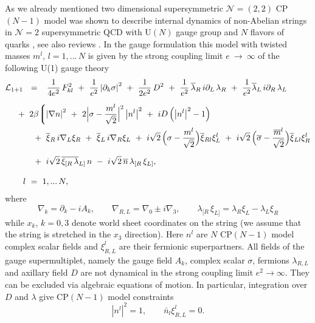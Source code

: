 \documentclass[12pt]{article}
\def\beq{\begin{equation}}
\def\eeq{\end{equation}}
\newcommand{\ntwo}{${\mathcal N}=2$ }
\newcommand{\ntwot}{${\mathcal N}= \left(2,2\right) $ }
\newcommand{\p}{\partial}
\newcommand{\ov}{\overline}
\newcommand{\mc}[1]{\mathcal{#1}}
\newcommand{\bxir}{\ov{\xi}{}_R}
\newcommand{\bxil}{\ov{\xi}{}_L}
\newcommand{\xir}{\xi_R}
\newcommand{\xil}{\xi_L}
\newcommand{\nbar}{\ov{n}}
\newcommand{\lar}{\lambda_R}
\newcommand{\lal}{\lambda_L}
\newcommand{\blar}{\ov{\lambda}{}_R}
\newcommand{\blal}{\ov{\lambda}{}_L}
\begin{document}
As we already mentioned two dimensional
supersymmetric \ntwot CP$(N-1)$  model was shown to describe
internal dynamics of  non-Abelian strings in \ntwo
supersymmetric QCD with U$(N)$ gauge group and $N$ flavors
of quarks \cite{HT1,ABEKY,SYmon,HT2}, see
also reviews \cite{Trev,SYrev,Jrev,Trev2}. In the gauge formulation this model 
with twisted
masses $ m^l $, $ l = 1, ...\, N $ is given by the strong coupling limit $ e ~\to~ \infty $ of
the following U(1) gauge theory \cite{W79}
\begin{align}
\label{sigma22}
% 
\notag
 	\mc{L}_\text{1+1} & ~~=~~
	\,\frac{1}{4e^2}\,F_{kl}^2  ~+~ \frac{1}{e^2} \left|\p_k \sigma\right|^2 
	~+~ \frac{1}{2e^2}\, D^2
	~+~ \frac{1}{e^2}\, \blar\, i\p_L\, \lar  ~+~  \frac{1}{e^2} \blal\, i\p_R\, \lal
	\\[2mm]
%
\notag
	&
	\hspace{-0.4cm}
	~+~ 2\beta \biggl \lgroup
	\left| \nabla n \right|^2  ~+~ 2 \Bigl| \sigma - \frac{m^l}
	{\sqrt{2}} \Bigr|^2 \left| n^l \right|^2
	~+~ iD \left( \left|n^l \right|^2 - 1 \right)
	\\
%
\notag
	&
	\hspace{-0.4cm}\phantom{2\beta\lgroup}
	~+~ \bxir\, i\nabla_L \xir  ~+~ \bxil\, i\nabla_R \xil ~+~
	i\sqrt{2}\, \Bigl( \sigma - \frac{m^l}{\sqrt{2}} \Bigr) \ov{\xi}{}_{Rl} \xi_L^l
	~+~ i\sqrt{2}\, \Bigl( \ov{\sigma} - \frac{\ov{m}{}^l}{\sqrt{2}} \Bigr) \ov{\xi}{}_{Ll} \xi_R^l
	\\[2mm]
%
	&
	\hspace{-0.4cm}\phantom{2\beta\lgroup}
	~+~ i\sqrt{2}\, \ov{\xi_{[R}\, \lambda}{}_{L]}\, n
	~-~ i\sqrt{2}\, \nbar\,  \lambda_{[R}\, \xi_{L]}
 ,
	\\[1mm]
%
\notag
	&
	l~=~1,...\,N,
\end{align}
where
\beq
\nabla_k=\p_k-iA_k, \qquad \nabla_{R,L}=\nabla_0\pm i\nabla_3,
\qquad \lambda_{[R}\, \xi_{L]}= \lambda_R\xi_L-\lambda_L\xi_R
\eeq
while $x_k$, $k=0,3$ denote world sheet coordinates
on the string (we assume that the string is stretched in the
$x_3$ direction). Here $n^l$ are $N$ CP$(N-1)$ model 
complex scalar fields
and $\xi^l_{R,L}$ are their fermionic superpartners.
All fields of the gauge supermultiplet, namely
the gauge field $A_k$, complex scalar $\sigma$, fermions
$\lambda_{R,L}$ and axillary field $D$ are not dynamical
in the strong coupling limit $e^2\to\infty$. They can be 
excluded via algebraic equations of motion. In particular,
integration over $D$ and $\lambda$ give CP$(N-1)$ model
constraints
\beq
|n^l|^2=1, \qquad \bar{n}_l\xi^l_{R,L}=0.
\eeq
\end{document}
